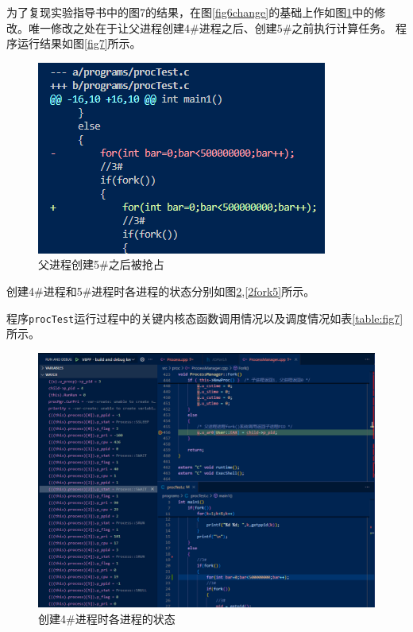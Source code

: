 为了复现实验指导书中的图7的结果，在图\ref{fig6change}的基础上作如图\ref{fig7change}中的修改。唯一修改之处在于让父进程创建4\#进程之后、创建5\#之前执行计算任务。
程序运行结果如图\ref{fig7}所示。

\begin{figure}[!htbp]
    \centering
    \includegraphics[scale=1]{images/fig7change.png}
    \caption{父进程创建5\#之后被抢占}\label{fig7change}
\end{figure}

创建4\#进程和5\#进程时各进程的状态分别如图\ref{2fork4},\ref{2fork5}所示。

程序\texttt{procTest}运行过程中的关键内核态函数调用情况以及调度情况如表\ref{table:fig7}所示。

\begin{figure}[!htbp]
    \centering
    \includegraphics[width=\textwidth]{images/2fork4.png}
    \caption{创建4\#进程时各进程的状态}\label{2fork4}
\end{figure}

